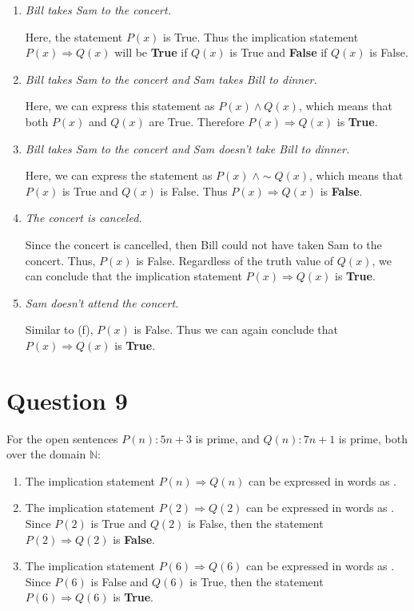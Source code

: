 \documentclass[11pt, oneside]{article}   	%
\begin{document}
\begin{enumerate}[ (a)]
    \item \textit{Bill takes Sam to the concert.}
    
    Here, the statement $P(x)$ is True. Thus the implication statement $P(x) \Rightarrow Q(x)$ will be \textbf{True} if $Q(x)$ is True and \textbf{False} if $Q(x)$ is False.
    
    \item \textit{Bill takes Sam to the concert and Sam takes Bill to dinner.}
    
    Here, we can express this statement as $P(x) \wedge Q(x)$, which means that both $P(x)$ and $Q(x)$ are True. Therefore $P(x) \Rightarrow Q(x)$ is \textbf{True}.
    
    \item \textit{Bill takes Sam to the concert and Sam doesn't take Bill to dinner.}
    
    Here, we can express the statement as $P(x) \; \wedge \sim Q(x)$, which means that $P(x)$ is True and $Q(x)$ is False. Thus $P(x) \Rightarrow Q(x)$ is \textbf{False}.
    
    \item \textit{The concert is canceled.}
    
    Since the concert is cancelled, then Bill could not have taken Sam to the concert. Thus, $P(x)$ is False. Regardless of the truth value of $Q(x)$, we can conclude that the implication statement $P(x) \Rightarrow Q(x)$ is \textbf{True}.
    
    \item \textit{Sam doesn't attend the concert.}
    
    Similar to (f), $P(x)$ is False. Thus we can again conclude that $P(x) \Rightarrow Q(x)$ is \textbf{True}.

\end{enumerate}


\section*{Question 9}

For the open sentences $P(n) : 5n + 3$ is prime, and $Q(n) : 7n+1$ is prime, both over the domain $\mathbb{N}$:

\begin{enumerate}[ (a)]    

    \item The implication statement $P(n) \Rightarrow Q(n)$ can be expressed in words as .
    \item The implication statement $P(2) \Rightarrow Q(2)$ can be expressed in words as . Since $P(2)$ is True and $Q(2)$ is False, then the statement $P(2) \Rightarrow Q(2)$ is \textbf{False}.
    \item The implication statement $P(6) \Rightarrow Q(6)$ can be expressed in words as . Since $P(6)$ is False and $Q(6)$ is True, then the statement $P(6) \Rightarrow Q(6)$ is \textbf{True}.

\end{enumerate}
\end{document}
